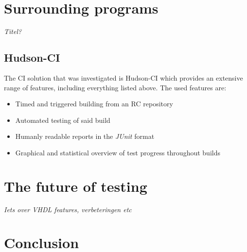\documentclass[11pt,british]{article}
\begin{document}
\section{Surrounding programs}
\emph{\color{red}Titel?}\\

\subsection{Hudson-CI}
\label{subsec:Hudson}
The \gls{CI} solution that was investigated is Hudson-CI which provides an extensive range of features, including everything listed above. The used features are:
\begin{itemize}
\item Timed and triggered building from an \gls{RC} repository
\item Automated testing of said build
\item Humanly readable reports in the \emph{JUnit} format
\item Graphical and statistical overview of test progress throughout builds
\end{itemize}

\newpage{}
\section{The future of testing}
\emph{\color{red} Iets over VHDL features, verbeteringen etc}

\newpage{}
\section{Conclusion}

\pagebreak{}

\printbibliography

\newpage{}
\end{document}
